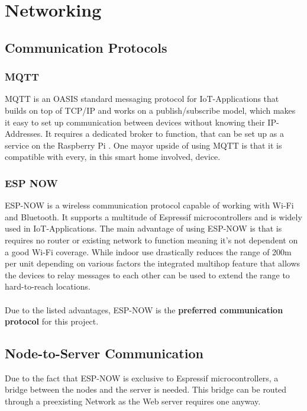 \chapter{Networking}
\section{Communication Protocols}
    \subsection{MQTT}
    MQTT is an OASIS standard messaging protocol for 
    IoT-Applications that builds on top of TCP/IP and 
    works on a publish/subscribe model, which makes it easy
    to set up communication between devices without knowing
    their IP-Addresses. It requires a dedicated broker to
    function, that can be set up as a service on the 
    Raspberry Pi \cite{mqtt_nodate}.
    One mayor upside of using MQTT is that it is compatible
    with every, in this smart home involved, device.


    \subsection{ESP NOW} 
    ESP-NOW is a wireless communication protocol capable of
    working with Wi-Fi and Bluetooth. It supports a 
    multitude of Espressif microcontrollers and is widely 
    used in IoT-Applications. The main advantage of using
    ESP-NOW is that is requires no router or existing
    network to function meaning it's not dependent on
    a good Wi-Fi coverage. While indoor use drastically
    reduces the range of 200m per unit depending on various
    factors \cite{esp-now-reach_2024} 
    the integrated multihop feature that allows the devices 
    to relay messages to each other can be used to extend 
    the range to hard-to-reach locations.\\~\\
    Due to the listed advantages, ESP-NOW is the \textbf{preferred
    communication protocol} for this project.


\section{Node-to-Server Communication}
Due to the fact that ESP-NOW is exclusive to Espressif microcontrollers,
a bridge between the nodes and the server is needed. This bridge can be 
routed through a preexisting Network as the Web server requires 
one anyway.


